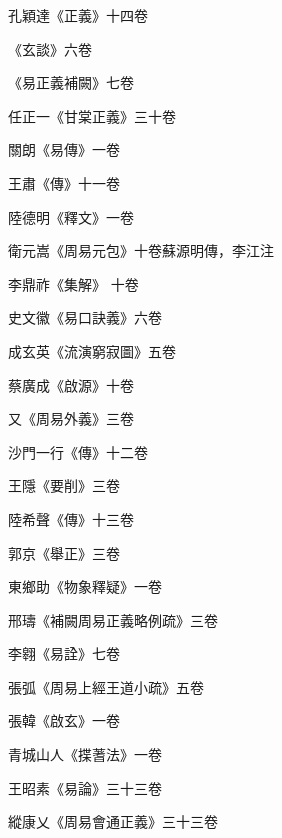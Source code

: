 \begin{pinyinscope}
 孔穎達《正義》十四卷



 《玄談》六卷



 《易正義補闕》七卷



 任正一《甘棠正義》三十卷



 關朗《易傳》一卷



 王肅《傳》十一卷



 陸德明《釋文》一卷



 衛元嵩《周易元包》十卷蘇源明傳，李江注



 李鼎祚《集解》
 十卷



 史文徽《易口訣義》六卷



 成玄英《流演窮寂圖》五卷



 蔡廣成《啟源》十卷



 又《周易外義》三卷



 沙門一行《傳》十二卷



 王隱《要削》三卷



 陸希聲《傳》十三卷



 郭京《舉正》三卷



 東鄉助《物象釋疑》一卷



 邢璹《補闕周易正義略例疏》三卷



 李翱《易詮》七卷



 張弧《周易上經王道小疏》五卷



 張韓《啟玄》一卷



 青城山人《揲蓍法》一卷



 王昭素《易論》三十三卷



 縱康乂《周易會通正義》三十三卷




\end{pinyinscope}
